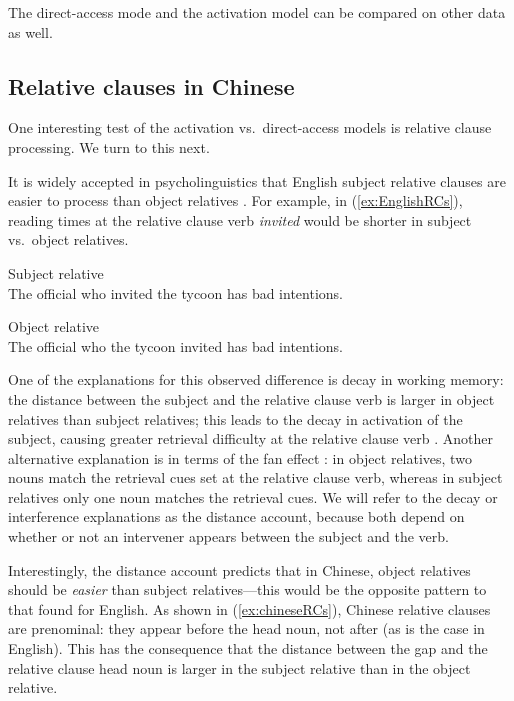 \documentclass{cambridge7A}\usepackage[]{graphicx}\usepackage[]{color}
\begin{document}
The direct-access mode and the activation model can be compared on other data as well.

\subsection{Relative clauses in Chinese} \label{rchinese}

One interesting test of the activation vs.\ direct-access models is relative clause processing. We turn to this next.

It is widely accepted in psycholinguistics that  English subject relative clauses are easier to process than object relatives \citep[e.g.,][]{grodner}. For example, in (\ref{ex:EnglishRCs}), reading times at the relative clause verb \textit{invited} would be shorter in  subject vs.\ object relatives.

\begin{exe}
\ex  \label{ex:EnglishRCs}
\begin{xlist}
\item Subject relative\\
The official who invited the tycoon has bad intentions.
\item 
Object relative \\
The official who the tycoon invited has bad intentions.
\end{xlist}
\end{exe}

One of the explanations for this observed difference is decay in working memory: the distance between the subject and the relative clause verb is larger in object relatives than subject relatives; this leads to the decay in activation of the subject, causing greater retrieval difficulty at the relative clause verb \citep{Gibson2000}. Another alternative explanation is in terms of the fan effect \citep{LewisVasishth2005}: in object relatives, two nouns match the retrieval cues  set at the relative clause verb, whereas in subject relatives only one noun matches the retrieval cues. We will refer to the decay or interference explanations as the distance account, because both depend on whether or not an intervener appears between the subject and the verb.

Interestingly, the distance account predicts that in Chinese, object relatives should be \textit{easier} than subject relatives---this would be the opposite pattern to that found for English. As shown in (\ref{ex:chineseRCs}), Chinese relative clauses are prenominal: they appear before the head noun, not after (as is the case in English). This has the consequence that the distance between the  gap and the relative clause head noun is larger in the subject relative than in the object relative. 
\end{document}
